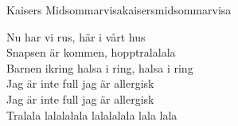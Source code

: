 \begin{song}{Kaisers Midsommarvisa}{kaisersmidsommarvisa}
\begin{vers}
Nu har vi rus, här i vårt hus\\
Snapsen är kommen, hopptralalala\\
Barnen ikring halsa i ring, halsa i ring\\
\repopen Jag är inte full jag är allergisk\\
Jag är inte full jag är allergisk \\
Tralala lalalalala lalalalala lala lala \repclose\\
\end{vers}
\end{song}
